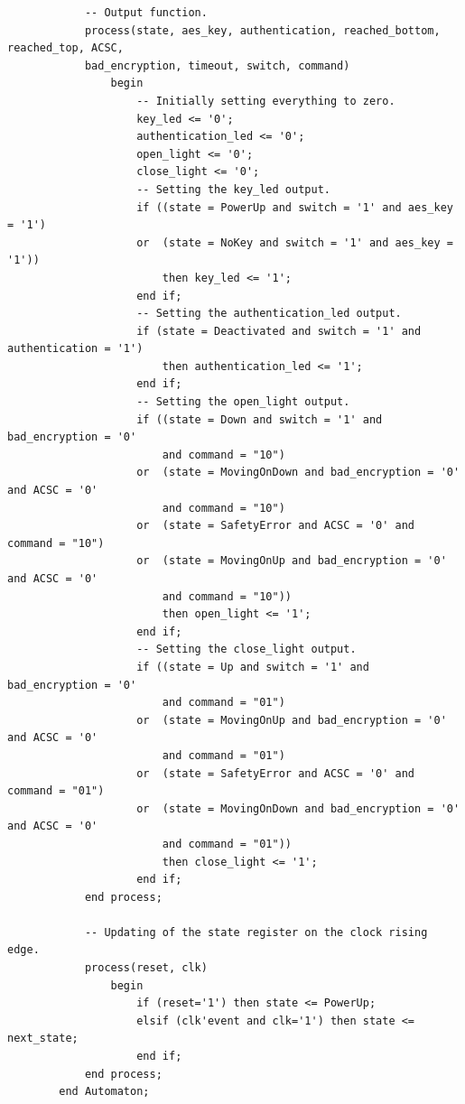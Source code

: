 \documentclass[a4paper,11pt]{article}
\begin{document}
\begin{verbatim}
            -- Output function.
            process(state, aes_key, authentication, reached_bottom, reached_top, ACSC,
            bad_encryption, timeout, switch, command)
                begin
                    -- Initially setting everything to zero.
                    key_led <= '0';
                    authentication_led <= '0';
                    open_light <= '0';
                    close_light <= '0';
                    -- Setting the key_led output.
                    if ((state = PowerUp and switch = '1' and aes_key = '1')
                    or  (state = NoKey and switch = '1' and aes_key = '1'))
                        then key_led <= '1';
	                end if;
                    -- Setting the authentication_led output.
                    if (state = Deactivated and switch = '1' and authentication = '1')
                        then authentication_led <= '1';
	                end if;
                    -- Setting the open_light output.
                    if ((state = Down and switch = '1' and bad_encryption = '0'
                        and command = "10")
                    or  (state = MovingOnDown and bad_encryption = '0' and ACSC = '0'
                        and command = "10")
                    or  (state = SafetyError and ACSC = '0' and command = "10")
                    or  (state = MovingOnUp and bad_encryption = '0' and ACSC = '0'
                        and command = "10"))
                        then open_light <= '1';
	                end if;
                    -- Setting the close_light output.
                    if ((state = Up and switch = '1' and bad_encryption = '0'
                        and command = "01")
                    or  (state = MovingOnUp and bad_encryption = '0' and ACSC = '0'
                        and command = "01")
                    or  (state = SafetyError and ACSC = '0' and command = "01")
                    or  (state = MovingOnDown and bad_encryption = '0' and ACSC = '0'
                        and command = "01"))
                        then close_light <= '1';
	                end if;
            end process;

            -- Updating of the state register on the clock rising edge.
            process(reset, clk)
                begin
                    if (reset='1') then state <= PowerUp;
                    elsif (clk'event and clk='1') then state <= next_state;
	                end if;
            end process;
        end Automaton;
    \end{verbatim}
    
\end{document}
